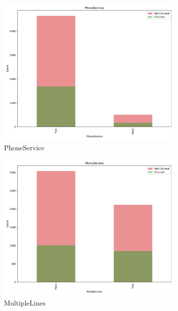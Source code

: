 \documentclass[a4paper,11pt]{article}
\begin{document}
\begin{landscape}
\begin{figure}
\begin{subfigure}{0.14\linewidth}
    \includegraphics[width=\linewidth]{figures/understanding/PhoneService.pdf}
    \caption{PhoneService}
\end{subfigure}
\begin{subfigure}{0.14\linewidth}
    \includegraphics[width=\linewidth]{figures/understanding/MultipleLines.pdf}
    \caption{MultipleLines}
\end{subfigure}
\begin{subfigure}{0.14\linewidth}

\end{subfigure}
\end{figure}
\end{landscape}
\end{document}
